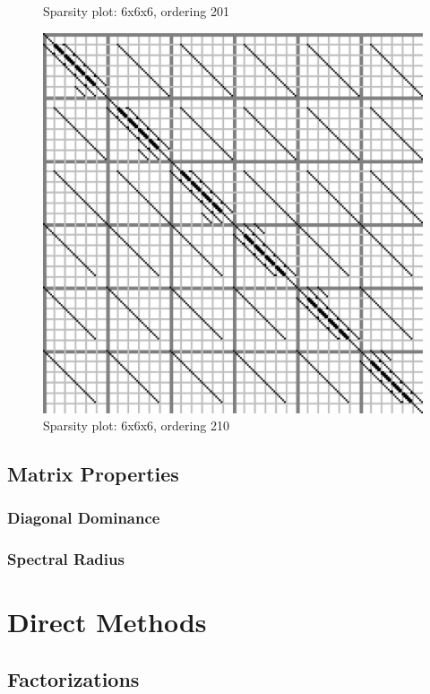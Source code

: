 \documentclass[10pt]{article}
\begin{document}
\begin{multicols}{2}
\begin{center}
\begin{minipage}[t]{.5\textwidth}
\begin{figure}[H]
	\caption{Sparsity plot: 6x6x6, ordering 201 }
\end{figure}
\vspace{\spmgin}
\begin{figure}[H]
	\centering
	\includegraphics[width=\spwidth]{../img/sparsity/int_small_6x6x6_210.eps}
	\caption{Sparsity plot: 6x6x6, ordering 210 }
\end{figure}
\end{minipage}%
\end{center}
\pagebreak

\subsection{Matrix Properties}
\subsubsection{Diagonal Dominance}
\subsubsection{Spectral Radius}

\section{Direct Methods}
\subsection{Factorizations}

\end{multicols}
\end{document}
